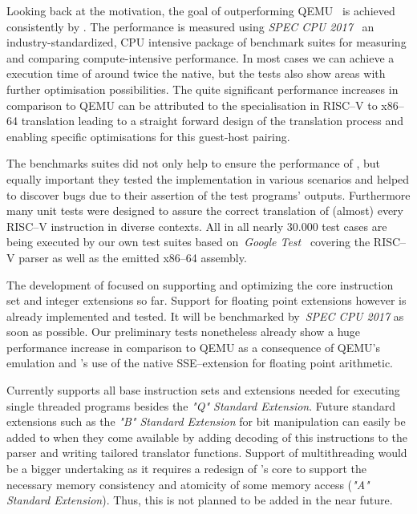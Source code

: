 Looking back at the motivation, the goal of outperforming QEMU~\cite{bellard2005qemu} is achieved consistently by \translatorname{}.
The performance is measured using \textit{SPEC CPU 2017}~\cite{spec-cpu-2017} an industry-standardized, CPU intensive package of benchmark suites for measuring and comparing compute-intensive performance.
In most cases we can achieve a execution time of around twice the native, but the tests also show areas with further optimisation possibilities. %
The quite significant performance increases in comparison to QEMU can be attributed to the specialisation in RISC--V to x86--64 translation leading to a straight forward design of the translation process and enabling specific optimisations for this guest-host pairing.

The benchmarks suites did not only help to ensure the performance of \translatorname{}, but equally important they tested the implementation in various scenarios and helped to discover bugs due to their assertion of the test programs' outputs.
Furthermore many unit tests were designed to assure the correct translation of (almost) every RISC--V instruction in diverse contexts.
All in all nearly 30.000 test cases are being executed by our own test suites based on~\textit{Google Test}~\cite{gtest} covering the RISC--V parser as well as the emitted x86--64 assembly.

The development of \translatorname{} focused on supporting and optimizing the core instruction set and integer extensions so far.
Support for floating point extensions however is already implemented and tested.
It will be benchmarked by~\textit{SPEC CPU 2017} as soon as possible.
Our preliminary tests nonetheless already show a huge performance increase in comparison to QEMU as a consequence of QEMU's emulation and \translatorname{}'s use of the native SSE--extension for floating point arithmetic.


Currently \translatorname{} supports all base instruction sets and extensions needed for executing single threaded programs besides the \textit{"Q" Standard Extension}.
Future standard extensions such as the \textit{"B" Standard Extension} for bit manipulation can easily be added to \translatorname{} when they come available by adding decoding of this instructions to the parser and writing tailored translator functions.
Support of multithreading would be a bigger undertaking as it requires a redesign of \translatorname{}'s core to support the necessary memory consistency and atomicity of some memory access (\textit{"A" Standard Extension}).
Thus, this is not planned to be added in the near future.

